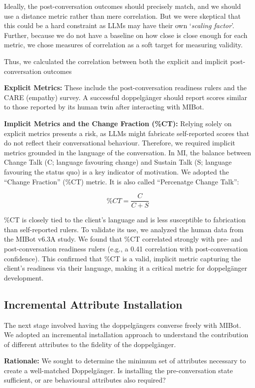Ideally, the post-conversation outcomes should precisely match, and we should use a distance metric rather than mere correlation. But we were skeptical that this could be a hard constraint as LLMs may have their own `\textit{scaling factor}'. Further, because we do not have a baseline on how close is close enough for each metric, we chose measures of correlation as a soft target for measuring validity.

Thus, we calculated the correlation between both the explicit and implicit post-conversation outcomes


\textbf{Explicit Metrics:} These include the post-conversation readiness rulers and the CARE (empathy) survey. A successful doppelgänger should report scores similar to those reported by its human twin after interacting with MIBot.

\textbf{Implicit Metrics and the Change Fraction (\%CT):} Relying solely on explicit metrics presents a risk, as LLMs might fabricate self-reported scores that do not reflect their conversational behaviour. Therefore, we required implicit metrics grounded in the language of the conversation. In MI, the balance between Change Talk (C; language favouring change) and Sustain Talk (S; language favouring the status quo) is a key indicator of motivation. We adopted the ``Change Fraction'' (\%CT) metric. It is also called ``Percenatge Change Talk'':

$$ \%CT = \frac{C}{C + S} $$

\%CT is closely tied to the client's language and is less susceptible to fabrication than self-reported rulers. To validate its use, we analyzed the human data from the MIBot v6.3A study. We found that \%CT correlated strongly with pre- and post-conversation readiness rulers (e.g., a 0.41 correlation with post-conversation confidence). This confirmed that \%CT is a valid, implicit metric capturing the client's readiness via their language, making it a critical metric for doppelgänger development.


\subsection{Incremental Attribute Installation}
\label{sec:incremental_installation}
The next stage involved having the doppelgängers converse freely with MIBot. We adopted an incremental installation approach to understand the contribution of different attributes to the fidelity of the doppelgänger.

\textbf{Rationale:}
We sought to determine the minimum set of attributes necessary to create a well-matched Doppelgänger. Is installing the pre-conversation state sufficient, or are behavioural attributes also required?

